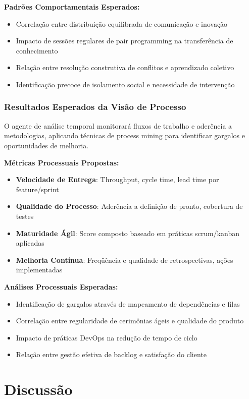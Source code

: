 \documentclass[english, spanish, brazilian]{modelo_dt}
\begin{document}
\textbf{Padrões Comportamentais Esperados:}
\begin{itemize}
  \item Correlação entre distribuição equilibrada de comunicação e inovação
  \item Impacto de sessões regulares de pair programming na transferência de
        conhecimento
  \item Relação entre resolução construtiva de conflitos e aprendizado coletivo
  \item Identificação precoce de isolamento social e necessidade de intervenção
\end{itemize}

\subsubsection{Resultados Esperados da Visão de Processo}

O agente de análise temporal monitorará fluxos de trabalho e aderência a
metodologias, aplicando técnicas de process mining para identificar gargalos e
oportunidades de melhoria.

\textbf{Métricas Processuais Propostas:}
\begin{itemize}
  \item \textbf{Velocidade de Entrega}: Throughput, cycle time, lead time por feature/sprint
  \item \textbf{Qualidade do Processo}: Aderência a definição de pronto, cobertura de testes
  \item \textbf{Maturidade Ágil}: Score composto baseado em práticas scrum/kanban aplicadas
  \item \textbf{Melhoria Contínua}: Freqüência e qualidade de retrospectivas, ações implementadas
\end{itemize}

\textbf{Análises Processuais Esperadas:}
\begin{itemize}
  \item Identificação de gargalos através de mapeamento de dependências e filas
  \item Correlação entre regularidade de cerimônias ágeis e qualidade do produto
  \item Impacto de práticas DevOps na redução de tempo de ciclo
  \item Relação entre gestão efetiva de backlog e satisfação do cliente
\end{itemize}

\section{Discussão}
\end{document}
